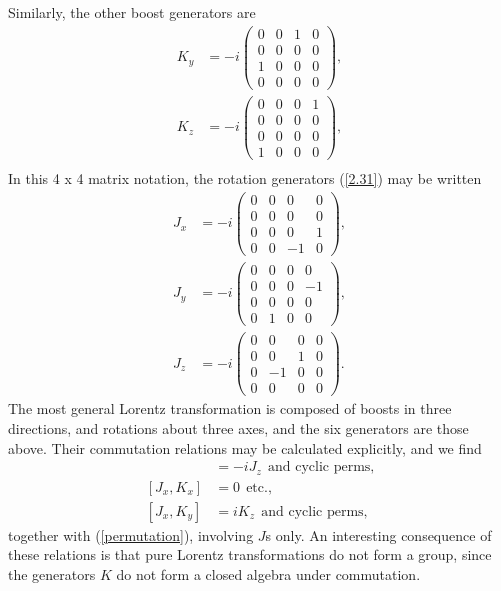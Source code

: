 \documentclass[12pt,a4paper]{report}
\begin{document}
Similarly, the other boost generators are
\begin{align}
    K_y&=-i\begin{pmatrix}
    0&0&1&0\\
    0&0&0&0\\
    1&0&0&0\\
    0&0&0&0
\end{pmatrix},\\
K_z&=-i\begin{pmatrix}
    0&0&0&1\\
    0&0&0&0\\
    0&0&0&0\\
    1&0&0&0
\end{pmatrix},\\
\end{align}
In this 4 x 4 matrix notation, the rotation generators (\eqref{2.31}) may be written
\begin{align}
    J_x&=-i\begin{pmatrix}
    0&0&0&0\\
    0&0&0&0\\
    0&0&0&1\\
    0&0&-1&0
\end{pmatrix},\\
J_y&=-i\begin{pmatrix}
    0&0&0&0\\
    0&0&0&-1\\
    0&0&0&0\\
    0&1&0&0
\end{pmatrix},\\
J_z&=-i\begin{pmatrix}
    0&0&0&0\\
    0&0&1&0\\
    0&-1&0&0\\
    0&0&0&0
\end{pmatrix}.
\end{align}
The most general Lorentz transformation is composed of boosts in three directions, and rotations about three axes, and the six generators are those above. Their commutation relations may be calculated explicitly, and we 
find \cite{Ryder}
\begin{align}
    [K_x,K_y]&=-iJ_z~~\text{and cyclic perms,}\\
    [J_x,K_x]&=0~~\text{etc.,}\\
    [J_x,K_y]&=iK_z~~\text{and cyclic perms,}
\end{align}
together with (\eqref{permutation}), involving $J$s only. An interesting consequence of these relations is that pure Lorentz transformations do not form a group, since the generators $K$ do not form a closed algebra under commutation. 
\end{document}
